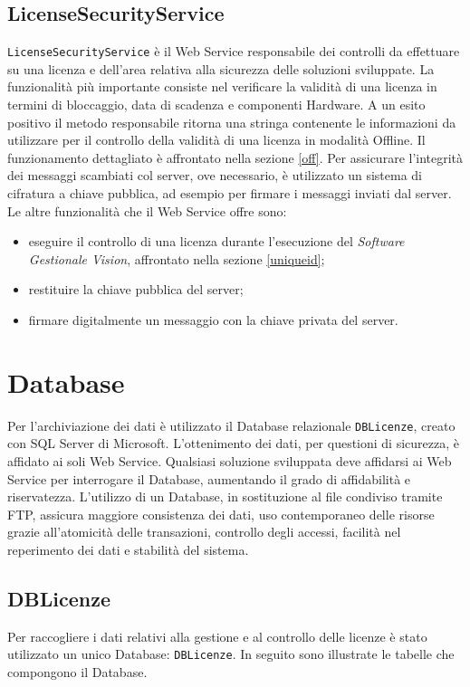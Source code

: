 \subsection{LicenseSecurityService}
\texttt{LicenseSecurityService} è il Web Service responsabile dei controlli da effettuare su una licenza e dell'area relativa alla sicurezza delle soluzioni sviluppate. La funzionalità più importante consiste nel verificare la validità di una licenza in termini di bloccaggio, data di scadenza e componenti Hardware. A un esito positivo il metodo responsabile ritorna una stringa contenente le informazioni da utilizzare per il controllo della validità di una licenza in modalità Offline. Il funzionamento dettagliato è affrontato nella sezione \ref{off}.
Per assicurare l'integrità dei messaggi scambiati col server, ove necessario, è utilizzato un sistema di cifratura a chiave pubblica, ad esempio per firmare i messaggi inviati dal server.\\
Le altre funzionalità che il Web Service offre sono:
\begin{itemize}
\item eseguire il controllo di una licenza durante l'esecuzione del \textit{Software Gestionale Vision}, affrontato nella sezione \ref{uniqueid};
\item restituire la chiave pubblica del server;
\item firmare digitalmente un messaggio con la chiave privata del server.

\end{itemize}


\section{Database}
\label{sez:DBLic}
Per l'archiviazione dei dati è utilizzato il Database relazionale \texttt{DBLicenze}, creato con SQL Server di Microsoft. L'ottenimento dei dati, per questioni di sicurezza, è affidato ai soli Web Service. Qualsiasi soluzione sviluppata deve affidarsi ai Web Service per interrogare il Database, aumentando il grado di affidabilità e riservatezza. L'utilizzo di un Database, in sostituzione al file condiviso tramite FTP, assicura maggiore consistenza dei dati, uso contemporaneo delle risorse grazie all'atomicità delle transazioni, controllo degli accessi, facilità nel reperimento dei dati e stabilità del sistema.


\subsection{DBLicenze}
Per raccogliere i dati relativi alla gestione e al controllo delle licenze è stato utilizzato un unico Database: \texttt{DBLicenze}. In seguito sono illustrate le tabelle che compongono il Database.

